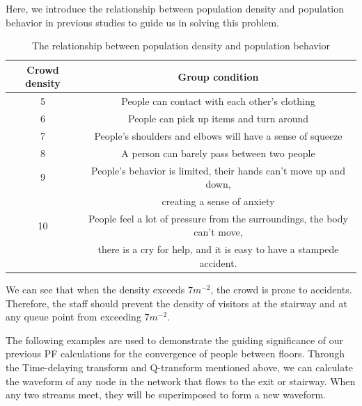 Here, we introduce the relationship between population density and population behavior in previous studies to guide us in solving this problem.
\begin{table}[H]
\centering
\begin{tabular}{c|c}
\toprule
Crowd density&Group condition\\
\midrule
5&People can contact with each other's clothing\\
\midrule
6&People can pick up items and turn around\\
\midrule
7&People's shoulders and elbows will have a sense of squeeze\\
\midrule
8&A person can barely pass between two people\\
\midrule
9&People's behavior is limited, their hands can't move up and down,\\ &creating a sense of anxiety\\
\midrule
10&People feel a lot of pressure from the surroundings, the body can't move,\\ &there is a cry for help, and it is easy to have a stampede accident.\\
\bottomrule
\end{tabular}
\caption{The relationship between population density and population behavior}
\end{table}

We can see that when the density exceeds $7m^{-2}$, the crowd is prone to accidents. Therefore, the staff should prevent the density of visitors at the stairway and at any queue point from exceeding $7m^{-2}$.

The following examples are used to demonstrate the guiding significance of our previous PF calculations for the convergence of people between floors.
Through the Time-delaying transform and Q-transform mentioned above, we can calculate the waveform of any node in the network that flows to the exit or stairway. When any two streams meet, they will be superimposed to form a new waveform.


